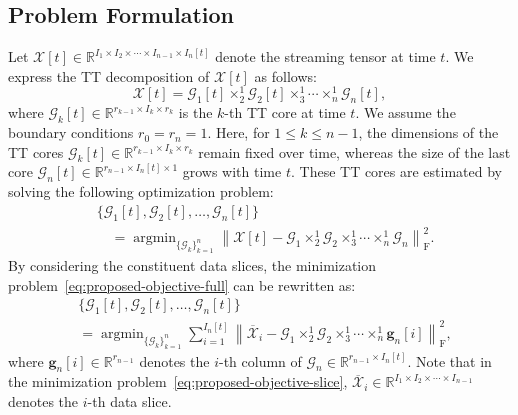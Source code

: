 \documentclass[a4paper, 11pt]{article}
\DeclareMathOperator*{\argmin}{argmin}
\newcommand{\ttimes}[2]{\times_{#1}^{#2}}
\theoremstyle{plain}
\theoremstyle{definition}
\theoremstyle{remark}
\begin{document}
\subsection{Problem Formulation}
Let $\mathcal{X}[t] \in \mathbb{R}^{I_1 \times I_2 \times \cdots \times I_{n-1} \times I_n[t]}$ denote the streaming tensor at time $t$.
We express the TT decomposition of $\mathcal{X}[t]$ as follows:
\begin{equation*}
  \mathcal{X}[t] = \mathcal{G}_1[t] \ttimes{2}{1} \mathcal{G}_2[t] \ttimes{3}{1} \cdots \ttimes{n}{1} \mathcal{G}_n[t],
\end{equation*}
where $\mathcal{G}_k[t] \in \mathbb{R}^{r_{k-1} \times I_k \times r_k}$ is the $k$-th TT core at time $t$.
We assume the boundary conditions $r_0 = r_n = 1$.
Here, for $1 \leq k \leq n-1$, the dimensions of the TT cores $\mathcal{G}_k[t] \in \mathbb{R}^{r_{k-1} \times I_k \times r_k}$ remain fixed over time, whereas the size of the last core $\mathcal{G}_n[t] \in \mathbb{R}^{r_{n-1} \times I_n[t] \times 1}$ grows with time $t$.
These TT cores are estimated by solving the following optimization problem:
\begin{equation}
    \begin{split}
        & \{\mathcal{G}_1[t], \mathcal{G}_2[t], \ldots, \mathcal{G}_n[t]\} \\
        & \quad = \argmin_{\{\mathcal{G}_k\}_{k=1}^{n}} \left\| \mathcal{X}[t] - \mathcal{G}_1 \ttimes{2}{1} \mathcal{G}_2 \ttimes{3}{1} \cdots \ttimes{n}{1} \mathcal{G}_n \right\|_\mathrm{F}^2. 
    \end{split}\label{eq:proposed-objective-full}
\end{equation}
By considering the constituent data slices,
the minimization problem~\eqref{eq:proposed-objective-full} can be rewritten as:
\begin{equation}
    \begin{split}
        &\!\!\!\!\{\mathcal{G}_1[t], \mathcal{G}_2[t], \ldots, \mathcal{G}_n[t]\} \\
        &= \argmin_{\{\mathcal{G}_k\}_{k=1}^{n}} \sum_{i=1}^{I_n[t]} \left\| \overline{\mathcal{X}}_i - \mathcal{G}_1 \ttimes{2}{1} \mathcal{G}_2 \ttimes{3}{1} \cdots \ttimes{n}{1} \bm{g}_n[i] \right\|_\mathrm{F}^2, 
    \end{split}\label{eq:proposed-objective-slice}
\end{equation}
where $\bm{g}_n[i] \in \mathbb{R}^{r_{n-1}}$ denotes the $i$-th column of $\mathcal{G}_n \in \mathbb{R}^{r_{n-1} \times I_n[t]}$. 
Note that in the minimization problem~\eqref{eq:proposed-objective-slice}, $\overline{\mathcal{X}}_i \in \mathbb{R}^{I_1 \times I_2 \times \cdots \times I_{n-1}}$ denotes the $i$-th data slice.
\end{document}

